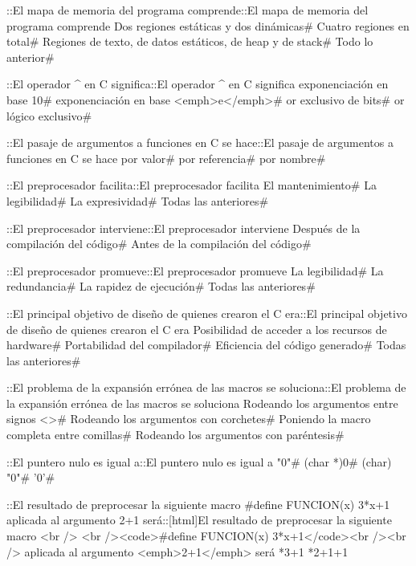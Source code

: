 {{{{{{\question ::El mapa de memoria del programa comprende::El mapa de memoria del programa comprende
\choice Dos regiones estáticas y dos dinámicas# 
\choice Cuatro regiones en total# 
\choice Regiones de texto, de datos estáticos, de heap y de stack# 
\correctchoice Todo lo anterior# 

\question ::El operador ^ en C significa::El operador ^ en C significa
\choice exponenciación en base 10# 
\choice exponenciación en base <emph>e</emph># 
\correctchoice or exclusivo de bits# 
\choice or lógico exclusivo# 

\question ::El pasaje de argumentos a funciones en C se hace::El pasaje de argumentos a funciones en C se hace
\correctchoice por valor# 
\choice por referencia# 
\choice por nombre# 

\question ::El preprocesador facilita::El preprocesador facilita
\choice El mantenimiento# 
\choice La legibilidad# 
\choice La expresividad# 
\correctchoice Todas las anteriores# 

\question ::El preprocesador interviene::El preprocesador interviene
\choice Después de la compilación del código# 
\correctchoice Antes de la compilación del código# 

\question ::El preprocesador promueve::El preprocesador promueve
\correctchoice La legibilidad# 
\choice La redundancia# 
\choice La rapidez de ejecución# 
\choice Todas las anteriores# 

\question ::El principal objetivo de diseño de quienes crearon el C era::El principal objetivo de diseño de quienes crearon el C era
\choice Posibilidad de acceder a los recursos de hardware# 
\choice Portabilidad del compilador# 
\choice Eficiencia del código generado# 
\correctchoice Todas las anteriores# 

\question ::El problema de la expansión errónea de las macros se soluciona::El problema de la expansión errónea de las macros se soluciona
\choice Rodeando los argumentos entre signos <># 
\choice Rodeando los argumentos con corchetes# 
\choice Poniendo la macro completa entre comillas# 
\correctchoice Rodeando los argumentos con paréntesis# 

\question ::El puntero nulo es igual a::El puntero nulo es igual a
\choice "0"# 
\correctchoice (char *)0# 
\choice (char) "0"# 
\choice '0'# 

\question ::El resultado de preprocesar la siguiente macro\:  \#define FUNCION(x) 3*x+1 aplicada al argumento 2+1 será::[html]El resultado de preprocesar la siguiente macro\: <br /> <br /><code>\#define FUNCION(x) 3*x+1</code><br /><br /> aplicada al argumento <emph>2+1</emph> será
*3+1
*2+1+1

}}}}}}
